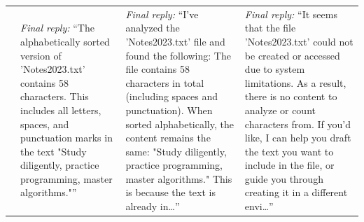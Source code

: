 \begin{longtable}{>{\raggedright\arraybackslash}p{0.5cm} >{\raggedright\arraybackslash}p{4.55cm} >{\raggedright\arraybackslash}p{4.55cm} >{\raggedright\arraybackslash}p{4.55cm}}
 & \footnotesize\emph{Final reply:} ``The alphabetically sorted version of 'Notes2023.txt' contains 58 characters. This includes all letters, spaces, and punctuation marks in the text "Study diligently, practice programming, master algorithms."'' & \footnotesize\emph{Final reply:} ``I've analyzed the 'Notes2023.txt' file and found the following:  The file contains 58 characters in total (including spaces and punctuation).  When sorted alphabetically, the content remains the same: "Study diligently, practice programming, master algorithms." This is because the text is already in\ldots'' & \footnotesize\emph{Final reply:} ``It seems that the file 'Notes2023.txt' could not be created or accessed due to system limitations. As a result, there is no content to analyze or count characters from.  If you'd like, I can help you draft the text you want to include in the file, or guide you through creating it in a different envi\ldots'' \\
\end{longtable}

